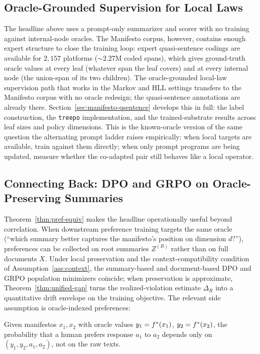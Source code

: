 \subsection{Oracle-Grounded Supervision for Local Laws}\label{sec:rile-oracle}

The headline above uses a prompt-only summarizer and scorer with no
training against internal-node oracles. The Manifesto corpus, however,
contains enough expert structure to close the training loop: expert
quasi-sentence codings are available for $2{,}157$ platforms
($\sim\!2.27$M coded spans), which gives ground-truth oracle values at
every leaf (whatever span the leaf covers) and at every internal node
(the union-span of its two children). The oracle-grounded local-law
supervision path that works in the Markov and HLL settings transfers
to the Manifesto corpus with no oracle redesign; the quasi-sentence
annotations are already there. Section~\ref{sec:manifesto-qsentence}
develops this in full: the label construction, the \texttt{treepo}
implementation, and the trained-substrate results across leaf sizes
and policy dimensions. This is the known-oracle version of the same
question the alternating prompt ladder raises empirically: when local
targets are available, train against them directly; when only prompt
programs are being updated, measure whether the co-adapted pair still
behaves like a local operator.

\subsection{Connecting Back: DPO and GRPO on Oracle-Preserving Summaries}

Theorem~\ref{thm:pref-equiv} makes the headline operationally useful
beyond correlation. When downstream preference training targets the
same oracle (``which summary better captures the manifesto's
position on dimension $d$?''), preferences can be collected on root
summaries $Z^{(R)}$ rather than on full documents $X$. Under local
preservation and the context-compatibility condition of
Assumption~\ref{ass:context}, the summary-based and
document-based DPO and GRPO population minimizers coincide; when
preservation is approximate, Theorem~\ref{thm:unified-gap} turns the
realized-violation estimate $\Delta_R$ into a quantitative drift
envelope on the training objective. The relevant side assumption is
oracle-indexed preferences:

\begin{assumption}\label{ass:pref}
Given manifestos $x_1, x_2$ with oracle values
$y_1 = f^\ast(x_1)$, $y_2 = f^\ast(x_2)$, the probability that a human
prefers response $a_1$ to $a_2$ depends only on $(y_1, y_2, a_1, a_2)$,
not on the raw texts.
\end{assumption}

